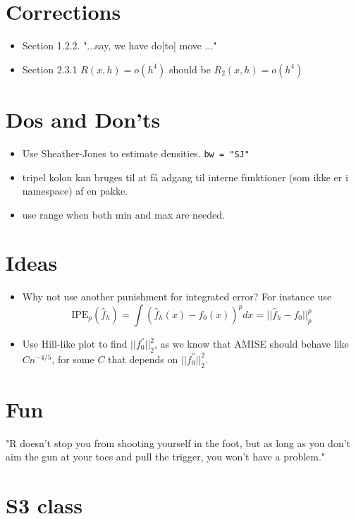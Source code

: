 \documentclass[12pt]{article}
\theoremstyle{my_thm}
\begin{document}
\section*{Corrections}
\begin{itemize}
\item Section 1.2.2. "...say, we have do[to] move ..."
\item Section 2.3.1 $R(x,h)=o(h^4)$ should be $R_2(x,h)=o(h^4)$

\end{itemize}
\section*{Dos and Don'ts}
\begin{itemize}
\item Use Sheather-Jones to estimate densities. \verb!bw = "SJ"! 
\item tripel kolon kan bruges til at få adgang til interne funktioner (som ikke er i namespace) af en pakke.
\item use range when both min and max are needed.
\end{itemize}

\section*{Ideas}
\begin{itemize}
\item Why not use another punishment for integrated error? For instance use
$$
\text{IPE}_p(\hat{f}_h)=\int (\hat{f}_h(x) - f_0(x))^p dx = ||\hat{f}_h -f_0 ||_p^p
$$
\item Use Hill-like plot to find $||f_0^{''}||^2_2$, as we know that AMISE should behave like $C n^{-4/5}$, for some $C$ that depends on $||f_0^{''}||^2_2$.	
\end{itemize}


\section{Fun}
"R doesn’t stop you from shooting yourself in the foot, but as long as you don’t aim the gun at your toes and pull the trigger, you won’t have a problem."
\\

\section{S3 class}

\newpage
\end{document}
